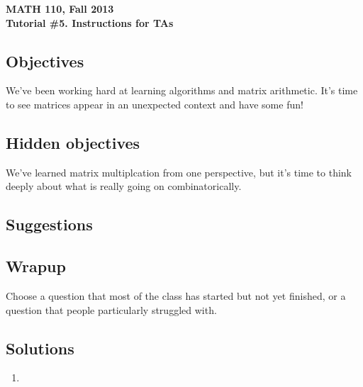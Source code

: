 \documentclass[11pt]{exam}
\newcommand{\mthCourse}{MATH 110}
\newcommand{\mthTerm}{Fall 2013}
\newcommand{\mthTutorialNumber}{5}
\begin{document}
\newpage
{\small
	\begin{center}
		{\bf \mthCourse, \mthTerm}\\ 
		{\bf Tutorial \#\mthTutorialNumber. Instructions for TAs}
	\end{center}
}

\subsection*{Objectives}

	We've been working hard at learning algorithms and matrix arithmetic.
	It's time to see matrices appear in an unexpected context and have some
	fun!

\subsection*{Hidden objectives}

	We've learned matrix multiplcation from one perspective, but it's
	time to think deeply about what is really going on combinatorically.

\subsection*{Suggestions}

\subsection*{Wrapup}
	Choose a question that most of the class has started but not yet finished,
	or a question that people particularly struggled with.

\subsection*{Solutions}
\begin{enumerate}
	\item
\end{enumerate}
	
\end{document}
